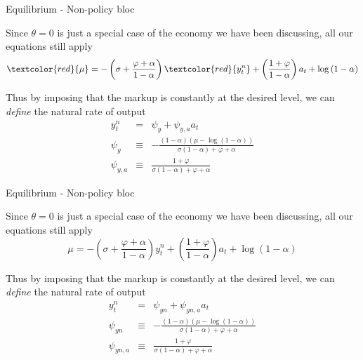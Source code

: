\documentclass{beamer}
\begin{document}

	
\begin{frame}{Equilibrium - Non-policy bloc}

Since $\theta=0$ is just a special case of the economy we have been discussing, all our equations still apply
\[
\textcolor{red}{\mu} = - \left( \sigma + \frac{\varphi + \alpha}{1-\alpha} \right)\textcolor{red}{y^{n}_{t}} + \left( \frac{1+\varphi}{1-\alpha} \right)a_{t}+ \log{(1-\alpha)}
\]

Thus by imposing that the markup is constantly at the desired level, we can \emph{define} the natural rate of output
\begin{eqnarray*}
y^{n}_{t} 	&=& 		\psi_{y} + \psi_{y,a} a_{t} \\
\psi_{y} 	&\equiv& 	-\frac{(1-\alpha)(\mu-\log{(1-\alpha)})}{\sigma(1-\alpha)+\varphi+\alpha} \\
\psi_{y,a}	&\equiv& 	\frac{1+\varphi}{\sigma(1-\alpha) + \varphi + \alpha}
\end{eqnarray*}

\end{frame}


	
\begin{frame}{Equilibrium - Non-policy bloc}

Since $\theta=0$ is just a special case of the economy we have been discussing, all our equations still apply
\[
\mu = - \left( \sigma + \frac{\varphi + \alpha}{1-\alpha} \right)y^{n}_{t} + \left( \frac{1+\varphi}{1-\alpha} \right)a_{t}+ \log{(1-\alpha)}
\]

Thus by imposing that the markup is constantly at the desired level, we can \emph{define} the natural rate of output
\begin{eqnarray}
y^{n}_{t} 	&=& 		\psi_{yn} + \psi_{yn,a} a_{t} \nonumber \\
\psi_{yn} 	&\equiv& 	-\frac{(1-\alpha)(\mu-\log{(1-\alpha)})}{\sigma(1-\alpha)+\varphi+\alpha} \nonumber \\
\psi_{yn,a}	&\equiv& 	\frac{1+\varphi}{\sigma(1-\alpha) + \varphi + \alpha} \nonumber
\end{eqnarray}

\end{frame}
\end{document}
